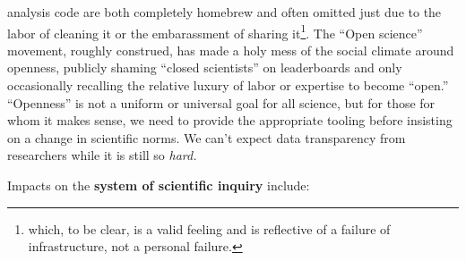 \documentclass[10pt]{article}
\begin{document}
\begin{multicols}{2}
\begin{itemize}
  analysis code are both completely homebrew and often omitted just due
  to the labor of cleaning it or the embarassment of sharing
  it\footnote{which, to be clear, is a valid feeling and is reflective
    of a failure of infrastructure, not a personal failure.}. The ``Open
  science'' movement, roughly construed, has made a holy mess of the
  social climate around openness, publicly shaming ``closed scientists''
  on leaderboards and only occasionally recalling the relative luxury of
  labor or expertise to become ``open.'' ``Openness'' is not a uniform
  or universal goal for all science, but for those for whom it makes
  sense, we need to provide the appropriate tooling before insisting on
  a change in scientific norms. We can't expect data transparency from
  researchers while it is still so \emph{hard.}
\end{itemize}

Impacts on the \textbf{system of scientific inquiry} include:

\begin{itemize}


\end{itemize}
\end{multicols}
\end{document}
